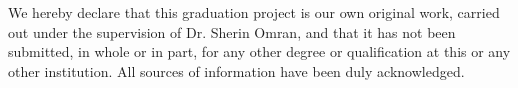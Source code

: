 We hereby declare that this graduation project is our own original work, carried out under the supervision of Dr. Sherin Omran, and that it has not been submitted, in whole or in part, for any other degree or qualification at this or any other institution. All sources of information have been duly acknowledged.

\vspace{1cm}

\clearpage